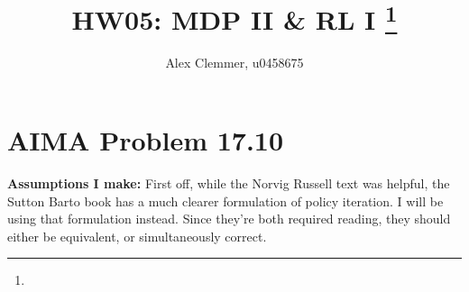 \documentclass[11pt]{article}
\title{HW05: MDP II \& RL I
\footnote{\s{CS 5300 AI; \;\; Spring 2012 \hfill
Instructor: Jur van den Berg, University of Utah}
}
}
\author{Alex Clemmer, u0458675}
\begin{document}
\maketitle





\section{AIMA Problem 17.10}

\textbf{Assumptions I make:} First off, while the Norvig Russell text was helpful, the Sutton Barto book has a much clearer formulation of policy iteration. I will be using that formulation instead. Since they're both required reading, they should either be equivalent, or simultaneously correct.
\end{document}
